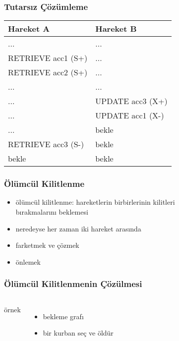 \documentclass[dvipsnames]{beamer}
\theoremstyle{plain}
\begin{document}
\begin{frame}[fragile]
  \frametitle{Tutarsız Çözümleme}

    \begin{table}
      \begin{tabular}{ll}
Hareket A            & Hareket B       \\\hline
...                  & ...             \\\pause
RETRIEVE acc1 (S+)   & ...             \\\pause
RETRIEVE acc2 (S+)   & ...             \\\pause
...                  & ...             \\
...                  & UPDATE acc3 (X+)\\\pause
...                  & UPDATE acc1 (X-)\\
...                  & bekle           \\\pause
RETRIEVE acc3 (S-)   & bekle           \\
bekle                & bekle
      \end{tabular}
    \end{table}
\end{frame}

\begin{frame}
  \frametitle{Ölümcül Kilitlenme}

    \begin{itemize}
    \item \alert{ölümcül kilitlenme}: hareketlerin birbirlerinin kilitleri\\ 
       bırakmalarını beklemesi
    \item neredeyse her zaman iki hareket arasında
  
    \medskip
    \item farketmek ve çözmek
    \item önlemek
    \end{itemize}
\end{frame}

\begin{frame}
  \frametitle{Ölümcül Kilitlenmenin Çözülmesi}

  \begin{columns}[t]
    \begin{exampleblock}{örnek}
      \begin{center}
      \end{center}
    \end{exampleblock}

    \begin{itemize}
      \item bekleme grafı
      \item bir \alert{kurban} seç ve öldür
    \end{itemize}
  \end{columns}
\end{frame}
\end{document}
